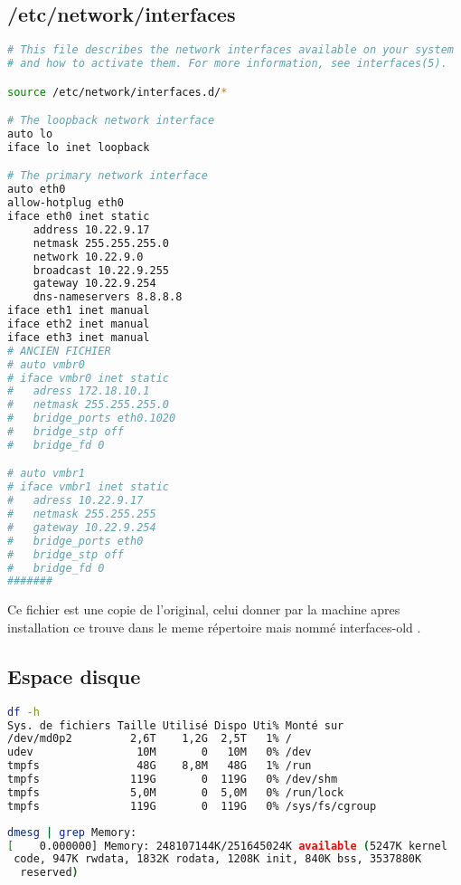 \documentclass[french]{article}
\begin{document}
\subsection{/etc/network/interfaces}

\begin{lstlisting}[language=bash,caption={/etc/network/interfaces},frame=single]
# This file describes the network interfaces available on your system
# and how to activate them. For more information, see interfaces(5).

source /etc/network/interfaces.d/*

# The loopback network interface
auto lo
iface lo inet loopback

# The primary network interface
auto eth0
allow-hotplug eth0
iface eth0 inet static
	address 10.22.9.17
	netmask 255.255.255.0
	network 10.22.9.0
	broadcast 10.22.9.255
	gateway 10.22.9.254
	dns-nameservers 8.8.8.8
iface eth1 inet manual
iface eth2 inet manual
iface eth3 inet manual
# ANCIEN FICHIER 
# auto vmbr0
# iface vmbr0 inet static 
# 	adress 172.18.10.1
# 	netmask 255.255.255.0
# 	bridge_ports eth0.1020
# 	bridge_stp off
# 	bridge_fd 0

# auto vmbr1
# iface vmbr1 inet static 
# 	adress 10.22.9.17
# 	netmask 255.255.255
# 	gateway 10.22.9.254
# 	bridge_ports eth0
# 	bridge_stp off
# 	bridge_fd 0 
#######

\end{lstlisting}
Ce fichier est une copie de l'original, celui donner par la machine apres installation ce trouve dans le meme répertoire mais nommé interfaces-old . 
\newpage
\subsection{Espace disque}
\begin{lstlisting}[language=bash,caption={df},frame=single]
df -h
Sys. de fichiers Taille Utilisé Dispo Uti% Monté sur
/dev/md0p2         2,6T    1,2G  2,5T   1% /
udev                10M       0   10M   0% /dev
tmpfs               48G    8,8M   48G   1% /run
tmpfs              119G       0  119G   0% /dev/shm
tmpfs              5,0M       0  5,0M   0% /run/lock
tmpfs              119G       0  119G   0% /sys/fs/cgroup
\end{lstlisting}

\begin{lstlisting}[language=bash,caption={dmesg},frame=single]
dmesg | grep Memory:
[    0.000000] Memory: 248107144K/251645024K available (5247K kernel
 code, 947K rwdata, 1832K rodata, 1208K init, 840K bss, 3537880K
  reserved)
\end{lstlisting}
\end{document}
